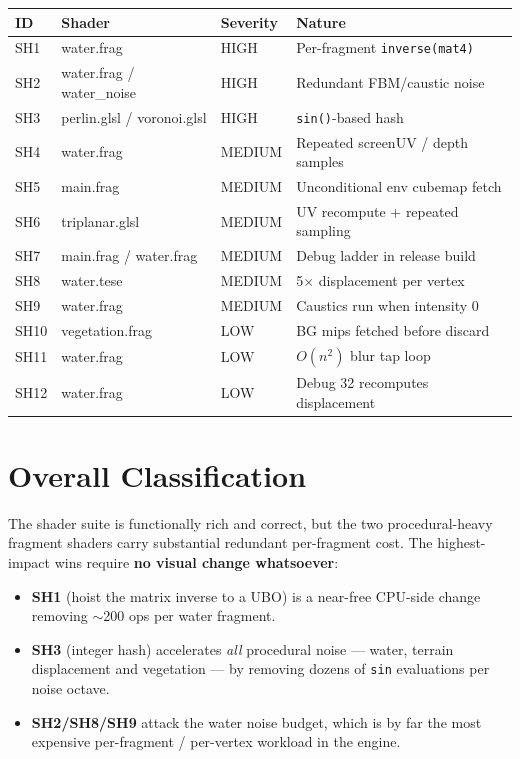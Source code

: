 \documentclass[a4paper,12pt]{article}
\begin{document}
\begin{center}
\begin{tabular}{llll}
\toprule
\textbf{ID} & \textbf{Shader} & \textbf{Severity} & \textbf{Nature} \\
\midrule
SH1  & water.frag              & HIGH   & Per-fragment \texttt{inverse(mat4)} \\
SH2  & water.frag / water\_noise & HIGH & Redundant FBM/caustic noise \\
SH3  & perlin.glsl / voronoi.glsl & HIGH & \texttt{sin()}-based hash \\
SH4  & water.frag              & MEDIUM & Repeated screenUV / depth samples \\
SH5  & main.frag               & MEDIUM & Unconditional env cubemap fetch \\
SH6  & triplanar.glsl          & MEDIUM & UV recompute + repeated sampling \\
SH7  & main.frag / water.frag  & MEDIUM & Debug ladder in release build \\
SH8  & water.tese              & MEDIUM & 5$\times$ displacement per vertex \\
SH9  & water.frag              & MEDIUM & Caustics run when intensity 0 \\
SH10 & vegetation.frag         & LOW    & BG mips fetched before discard \\
SH11 & water.frag              & LOW    & $O(n^2)$ blur tap loop \\
SH12 & water.frag              & LOW    & Debug 32 recomputes displacement \\
\bottomrule
\end{tabular}
\end{center}

\section{Overall Classification}

The shader suite is functionally rich and correct, but the two procedural-heavy
fragment shaders carry substantial redundant per-fragment cost. The highest-
impact wins require \textbf{no visual change whatsoever}:

\begin{itemize}[noitemsep]
  \item \textbf{SH1} (hoist the matrix inverse to a UBO) is a near-free CPU-side
        change removing $\sim$200 ops per water fragment.
  \item \textbf{SH3} (integer hash) accelerates \emph{all} procedural noise —
        water, terrain displacement and vegetation — by removing dozens of
        \texttt{sin} evaluations per noise octave.
  \item \textbf{SH2/SH8/SH9} attack the water noise budget, which is by far the
        most expensive per-fragment / per-vertex workload in the engine.
\end{itemize}
\end{document}
